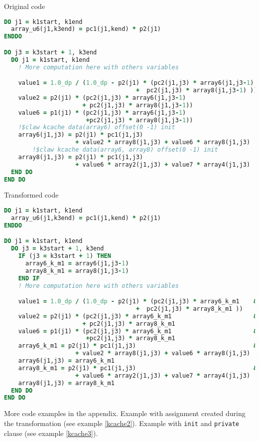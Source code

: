 Original code
\begin{lstlisting}[language=Fortran]
DO j1 = k1start, k1end
  array_u6(j1,k3end) = pc1(j1,kend) * p2(j1)
ENDDO

DO j3 = k3start + 1, k3end
  DO j1 = k1start, k1end
    ! More computation here with others variables

    value1 = 1.0_dp / (1.0_dp - p2(j1) * (pc2(j1,j3) * array6(j1,j3-1)  &
                                     +  pc2(j1,j3) * array8(j1,j3-1) ))
    value2 = p2(j1) * (pc2(j1,j3) * array6(j1,j3-1)                     &
                      + pc2(j1,j3) * array8(j1,j3-1))
    value6 = p1(j1) * (pc2(j1,j3) * array6(j1,j3-1)                     &
                       +pc2(j1,j3) * array8(j1,j3-1))
	!$claw kcache data(array6) offset(0 -1) init
    array6(j1,j3) = p2(j1) * pc1(j1,j3)                                 &
                    + value2 * array8(j1,j3) + value6 * array8(j1,j3)
    	!$claw kcache data(array6, array8) offset(0 -1) init
    array8(j1,j3) = p2(j1) * pc1(j1,j3)                                 &
                    + value6 * array2(j1,j3) + value7 * array4(j1,j3)
  END DO
END DO
\end{lstlisting}


Transformed code
\begin{lstlisting}[language=Fortran]
DO j1 = k1start, k1end
  array_u6(j1,k3end) = pc1(j1,kend) * p2(j1)
ENDDO

DO j1 = k1start, k1end
  DO j3 = k3start + 1, k3end
    IF (j3 = k3start + 1) THEN
      array6_k_m1 = array6(j1,j3-1)
      array8_k_m1 = array8(j1,j3-1)
    END IF
    ! More computation here with others variables

    value1 = 1.0_dp / (1.0_dp - p2(j1) * (pc2(j1,j3) * array6_k_m1    &
                                     +  pc2(j1,j3) * array8_k_m1 ))
    value2 = p2(j1) * (pc2(j1,j3) * array6_k_m1                       &
                      + pc2(j1,j3) * array8_k_m1
    value6 = p1(j1) * (pc2(j1,j3) * array6_k_m1                       &
                       +pc2(j1,j3) * array8_k_m1
	array6_k_m1 = p2(j1) * pc1(j1,j3)                                 &
                    + value2 * array8(j1,j3) + value6 * array8(j1,j3)
    array6(j1,j3) = array6_k_m1
    array8_k_m1 = p2(j1) * pc1(j1,j3)                                 &
                    + value6 * array2(j1,j3) + value7 * array4(j1,j3)
    array8(j1,j3) = array8_k_m1
  END DO
END DO
\end{lstlisting}

More code examples in the appendix. Example with assignment created during the
transformation (see example \ref{kcache2}). Example with \lstinline!init! and
\lstinline!private! clause (see example \ref{kcache3}).

